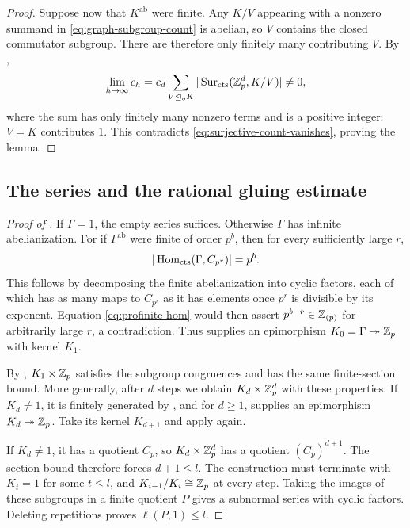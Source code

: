 \begin{proof}
Suppose now that $K^{\mathrm{ab}}$ were finite.  Any $K/V$ appearing
with a nonzero summand in \eqref{eq:graph-subgroup-count} is abelian,
so $V$ contains the closed commutator subgroup.  There are therefore
only finitely many contributing $V$.  By ,
\[
 \lim_{h\to\infty}c_h
    =c_d\sum_{V\trianglelefteq_o K}
                   |\operatorname{Sur}_{\mathrm{cts}}(\mathbb Z_p^d,K/V)|\ne0,
\]
where the sum has only finitely many nonzero terms and is a positive
integer: $V=K$ contributes $1$.  This contradicts
\eqref{eq:surjective-count-vanishes}, proving the lemma.
\end{proof}

\subsection{The series and the rational gluing estimate}

\begin{proof}[Proof of ]
If $\Gamma=1$, the empty series suffices.  Otherwise $\Gamma$ has
infinite abelianization.  For if $\Gamma^{\mathrm{ab}}$ were finite
of order $p^b$, then for every sufficiently large $r$,
\[
 |\operatorname{Hom}_{\mathrm{cts}}(\Gamma,C_{p^r})|=p^b.
\]
This follows by decomposing the finite abelianization into cyclic
factors, each of which has as many maps to $C_{p^r}$ as it has
elements once $p^r$ is divisible by its exponent. Equation
\eqref{eq:profinite-hom} would then assert
$p^{b-r}\in\mathbb Z_{(p)}$ for arbitrarily large $r$, a contradiction.
Thus  supplies an epimorphism
$K_0=\Gamma\twoheadrightarrow\mathbb Z_p$ with kernel $K_1$.

By , $K_1\times\mathbb Z_p$ satisfies the
subgroup congruences and has the same finite-section bound.  More
generally, after $d$ steps we obtain $K_d\times\mathbb Z_p^d$ with these
properties.  If $K_d\ne1$, it is finitely generated by
, and for $d\geq1$,
 supplies an epimorphism
$K_d\twoheadrightarrow\mathbb Z_p$.  Take its kernel $K_{d+1}$ and apply
 again.

If $K_d\ne1$, it has a quotient $C_p$, so
$K_d\times\mathbb Z_p^d$ has a quotient $(C_p)^{d+1}$.  The section bound
therefore forces $d+1\leq l$.  The construction must terminate with
$K_t=1$ for some $t\leq l$, and
$K_{i-1}/K_i\cong\mathbb Z_p$ at every step.  Taking the images of these
subgroups in a finite quotient $P$ gives a subnormal series with
cyclic factors.  Deleting repetitions proves $\ell(P,1)\leq l$.
\end{proof}

